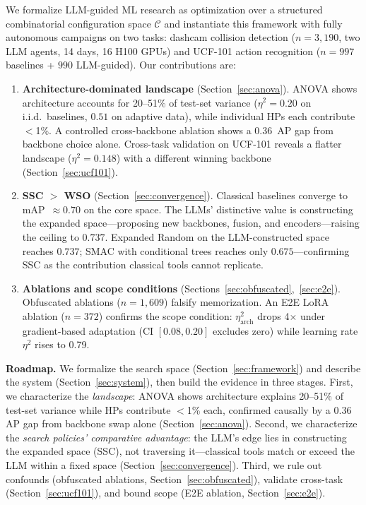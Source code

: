 \documentclass{article}
\newcommand{\Cspace}{\mathcal{C}}
\begin{document}
We formalize LLM-guided ML research as optimization over a structured combinatorial configuration space $\Cspace$ and instantiate this framework with fully autonomous campaigns on two tasks: dashcam collision detection ($n = 3{,}190$, two LLM agents, 14 days, 16 H100 GPUs) and UCF-101 action recognition ($n = 997$ baselines + $990$ LLM-guided).
Our contributions are:
\begin{enumerate}[leftmargin=*, itemsep=2pt]
    \item \textbf{Architecture-dominated landscape} (Section~\ref{sec:anova}). ANOVA shows architecture accounts for 20--51\% of test-set variance ($\eta^2 = 0.20$ on i.i.d.\ baselines, $0.51$ on adaptive data), while individual HPs each contribute $<$1\%. A controlled cross-backbone ablation shows a 0.36~AP gap from backbone choice alone. Cross-task validation on UCF-101 reveals a flatter landscape ($\eta^2 = 0.148$) with a different winning backbone (Section~\ref{sec:ucf101}).

    \item \textbf{SSC $>$ WSO} (Section~\ref{sec:convergence}). Classical baselines converge to mAP~$\approx 0.70$ on the core space. The LLMs' distinctive value is constructing the expanded space---proposing new backbones, fusion, and encoders---raising the ceiling to $0.737$. Expanded Random on the LLM-constructed space reaches $0.737$; SMAC with conditional trees reaches only $0.675$---confirming SSC as the contribution classical tools cannot replicate.

    \item \textbf{Ablations and scope conditions} (Sections~\ref{sec:obfuscated},~\ref{sec:e2e}). Obfuscated ablations ($n = 1{,}609$) falsify memorization. An E2E LoRA ablation ($n = 372$) confirms the scope condition: $\eta^2_{\mathrm{arch}}$ drops 4$\times$ under gradient-based adaptation (CI $[0.08, 0.20]$ excludes zero) while learning rate $\eta^2$ rises to 0.79.
\end{enumerate}

\noindent\textbf{Roadmap.} We formalize the search space (Section~\ref{sec:framework}) and describe the system (Section~\ref{sec:system}), then build the evidence in three stages.
First, we characterize the \emph{landscape}: ANOVA shows architecture explains 20--51\% of test-set variance while HPs contribute $<$1\% each, confirmed causally by a 0.36 AP gap from backbone swap alone (Section~\ref{sec:anova}).
Second, we characterize the \emph{search policies' comparative advantage}: the LLM's edge lies in constructing the expanded space (SSC), not traversing it---classical tools match or exceed the LLM within a fixed space (Section~\ref{sec:convergence}).
Third, we rule out confounds (obfuscated ablations, Section~\ref{sec:obfuscated}), validate cross-task (Section~\ref{sec:ucf101}), and bound scope (E2E ablation, Section~\ref{sec:e2e}).
\end{document}
